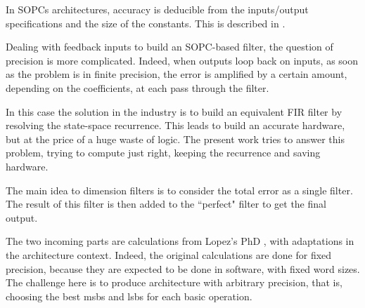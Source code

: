 	In SOPCs architectures, accuracy is deducible from the inputs/output specifications and the size of the constants.
	This is described in \cite{sums}.

	Dealing with feedback inputs to build an SOPC-based filter, the question of precision is more complicated.
	Indeed, when outputs loop back on inputs, as soon as the problem is in finite precision, the error is amplified by a certain amount, depending on the coefficients, at each pass through the filter.

	In this case the solution in the industry is to build an equivalent FIR filter by resolving the state-space recurrence.
	This leads to build an accurate hardware, but at the price of a huge waste of logic.
	The present work tries to answer this problem, trying to compute just right, keeping the recurrence and saving hardware.

	The main idea to dimension filters is to consider the total error as a single filter.
	The result of this filter is then added to the ``perfect" filter to get the final output.

	The two incoming parts are calculations from Lopez's PhD \cite{lopez}, with adaptations in the architecture context.
	Indeed, the original calculations are done for fixed precision, because they are expected to be done in software, with fixed word sizes.
	The challenge here is to produce architecture with arbitrary precision, that is, choosing the best msbs and lsbs for each basic operation.





